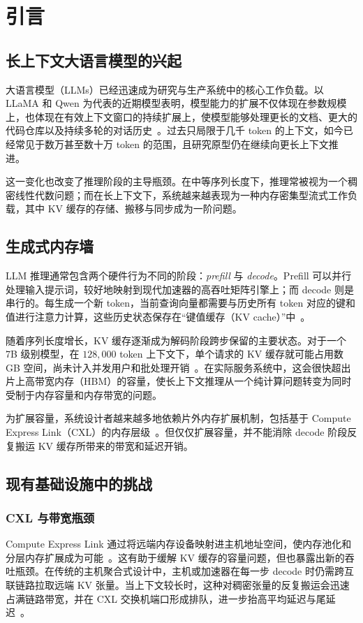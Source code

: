 \chapter{引言}
\label{ch:introduction}

\section{长上下文大语言模型的兴起}
大语言模型（LLMs）已经迅速成为研究与生产系统中的核心工作负载。以 LLaMA 和 Qwen 为代表的近期模型表明，模型能力的扩展不仅体现在参数规模上，也体现在有效上下文窗口的持续扩展上，使模型能够处理更长的文档、更大的代码仓库以及持续多轮的对话历史~\cite{llm_context, ring_attention}。过去只局限于几千 token 的上下文，如今已经常见于数万甚至数十万 token 的范围，且研究原型仍在继续向更长上下文推进。

这一变化也改变了推理阶段的主导瓶颈。在中等序列长度下，推理常被视为一个稠密线性代数问题；而在长上下文下，系统越来越表现为一种内存密集型流式工作负载，其中 KV 缓存的存储、搬移与同步成为一阶问题。

\section{生成式内存墙}
LLM 推理通常包含两个硬件行为不同的阶段：\textit{prefill} 与 \textit{decode}。Prefill 可以并行处理输入提示词，较好地映射到现代加速器的高吞吐矩阵引擎上；而 decode 则是串行的。每生成一个新 token，当前查询向量都需要与历史所有 token 对应的键和值进行注意力计算，这些历史状态保存在“键值缓存（KV cache）”中~\cite{vllm}。

随着序列长度增长，KV 缓存逐渐成为解码阶段跨步保留的主要状态。对于一个 7B 级别模型，在 $128{,}000$ token 上下文下，单个请求的 KV 缓存就可能占用数 GB 空间，尚未计入并发用户和批处理开销~\cite{vllm}。在实际服务系统中，这会很快超出片上高带宽内存（HBM）的容量，使长上下文推理从一个纯计算问题转变为同时受制于内存容量和内存带宽的问题。

为扩展容量，系统设计者越来越多地依赖片外内存扩展机制，包括基于 Compute Express Link（CXL）的内存层级~\cite{cxl_standard}。但仅仅扩展容量，并不能消除 decode 阶段反复搬运 KV 缓存所带来的带宽和延迟开销。

\section{现有基础设施中的挑战}

\subsection{CXL 与带宽瓶颈}
Compute Express Link 通过将远端内存设备映射进主机地址空间，使内存池化和分层内存扩展成为可能~\cite{cxl_pond}。这有助于缓解 KV 缓存的容量问题，但也暴露出新的吞吐瓶颈。在传统的主机聚合式设计中，主机或加速器在每一步 decode 时仍需跨互联链路拉取远端 KV 张量。当上下文较长时，这种对稠密张量的反复搬运会迅速占满链路带宽，并在 CXL 交换机端口形成排队，进一步抬高平均延迟与尾延迟~\cite{distserve}。

